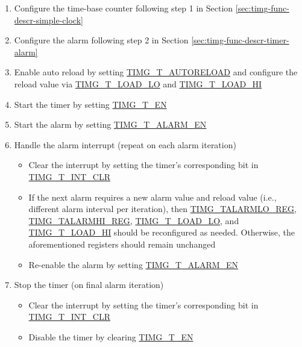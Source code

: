 \documentclass[main\_\_EN.tex]{subfiles}
\begin{document}
\begin{enumerate}
    \item Configure the time-base counter following step 1 in Section \ref{sec:timg-func-descr-simple-clock} \textit{}
    \item Configure the alarm following step 2 in Section \ref{sec:timg-func-descr-timer-alarm} \textit{}
    \item Enable auto reload by setting \hyperref[fielddesc:TIMGTXAUTORELOAD]{TIMG\_T\_AUTORELOAD} and configure the reload value via \hyperref[fielddesc:TIMGTXLOADLO]{TIMG\_T\_LOAD\_LO} and \hyperref[fielddesc:TIMGTXLOADHI]{TIMG\_T\_LOAD\_HI}
    \item Start the timer by setting \hyperref[fielddesc:TIMGTXEN]{TIMG\_T\_EN}
    \item Start the alarm by setting \hyperref[fielddesc:TIMGTXALARMEN]{TIMG\_T\_ALARM\_EN}
    \item Handle the alarm interrupt (repeat on each alarm iteration)
    \begin{itemize}
        \item Clear the interrupt by setting the timer's corresponding bit in \hyperref[fielddesc:TIMGTXINTCLR]{TIMG\_T\_INT\_CLR}
        \item If the next alarm requires a new alarm value and reload value (i.e., different alarm interval per iteration), then \hyperref[regdesc:TIMGTXALARMLOREG]{TIMG\_TALARMLO\_REG}, \hyperref[regdesc:TIMGTXALARMHIREG]{TIMG\_TALARMHI\_REG}, \hyperref[fielddesc:TIMGTXLOADLO]{TIMG\_T\_LOAD\_LO}, and \hyperref[fielddesc:TIMGTXLOADHI]{TIMG\_T\_LOAD\_HI} should be reconfigured as needed. Otherwise, the aforementioned registers should remain unchanged
        \item Re-enable the alarm by setting \hyperref[fielddesc:TIMGTXALARMEN]{TIMG\_T\_ALARM\_EN}
    \end{itemize}
    \item Stop the timer (on final alarm iteration)
    \begin{itemize}
        \item Clear the interrupt by setting the timer's corresponding bit in \hyperref[fielddesc:TIMGTXINTCLR]{TIMG\_T\_INT\_CLR}
        \item Disable the timer by clearing \hyperref[fielddesc:TIMGTXEN]{TIMG\_T\_EN}
    \end{itemize}
\end{enumerate}
\end{document}
